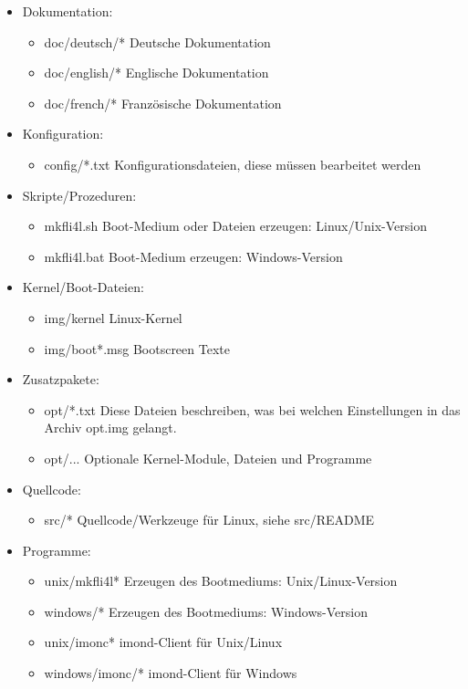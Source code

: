 \begin{itemize}
\item Dokumentation:
  \begin{itemize}
  \item doc/deutsch/* Deutsche Dokumentation
  \item doc/english/* Englische Dokumentation
  \item doc/french/*  Französische Dokumentation
  \end{itemize}

\item Konfiguration:
  \begin{itemize}
  \item config/*.txt Konfigurationsdateien, diese müssen bearbeitet
    werden
  \end{itemize}

\item Skripte/Prozeduren:
  \begin{itemize}
  \item mkfli4l.sh Boot-Medium oder Dateien erzeugen: Linux/Unix-Version
  \item mkfli4l.bat Boot-Medium erzeugen: Windows-Version
  \end{itemize}

\item Kernel/Boot-Dateien:
  \begin{itemize}
  \item img/kernel Linux-Kernel
  \item img/boot*.msg Bootscreen Texte
  \end{itemize}

\item Zusatzpakete:
  \begin{itemize}
  \item opt/*.txt Diese Dateien beschreiben, was bei welchen Einstellungen in
  das Archiv opt.img gelangt.
  \item opt/... Optionale Kernel-Module, Dateien und Programme
  \end{itemize}

\item Quellcode:
  \begin{itemize}
  \item src/* Quellcode/Werkzeuge für Linux, siehe src/README
  \end{itemize}

\item Programme:
  \begin{itemize}
  \item unix/mkfli4l* Erzeugen des Bootmediums: Unix/Linux-Version
  \item windows/* Erzeugen des Bootmediums: Windows-Version
  \item unix/imonc* imond-Client für Unix/Linux
  \item windows/imonc/* imond-Client für Windows
  \end{itemize}
\end{itemize}

